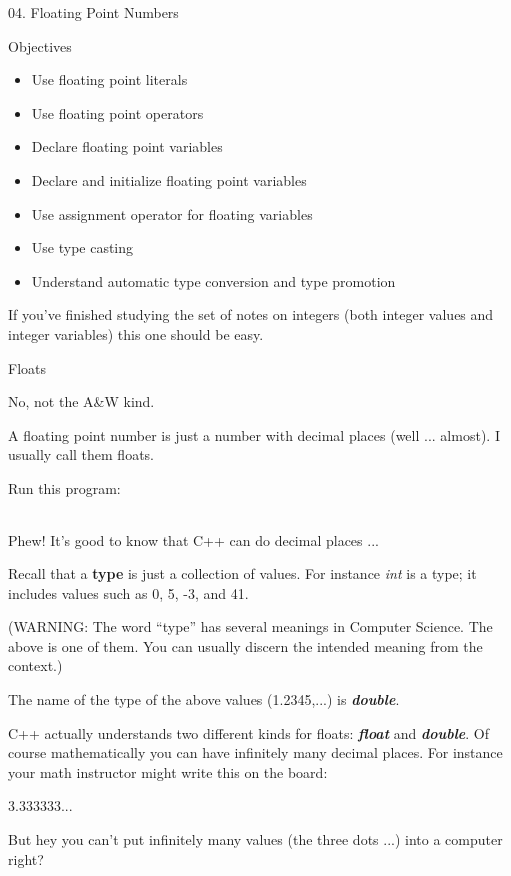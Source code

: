 \documentclass[
]{article}
\author{}
\date{}
\begin{document}
04. Floating Point Numbers

Objectives

\begin{itemize}
\item
  Use floating point literals
\item
  Use floating point operators
\item
  Declare floating point variables
\item
  Declare and initialize floating point variables
\item
  Use assignment operator for floating variables
\item
  Use type casting
\item
  Understand automatic type conversion and type promotion
\end{itemize}

If you've finished studying the set of notes on integers (both integer
values and integer variables) this one should be easy.

Floats

No, not the A\&W kind.

A floating point number is just a number with decimal places (well ...
almost). I usually call them floats.

Run this program:

\begin{longtable}[]{@{}@{}}
\toprule
\endhead
\bottomrule
\end{longtable}

Phew! It's good to know that C++ can do decimal places ...

Recall that a \textbf{type} is just a collection of values. For instance
\emph{int} is a type; it includes values such as 0, 5, -3, and 41.

(WARNING: The word ``type'' has several meanings in Computer Science.
The above is one of them. You can usually discern the intended meaning
from the context.)

The name of the type of the above values (1.2345,...) is
\emph{\textbf{double}}.

C++ actually understands two different kinds for floats:
\emph{\textbf{float}} and \emph{\textbf{double}}. Of course
mathematically you can have infinitely many decimal places. For instance
your math instructor might write this on the board:

3.333333...

But hey you can't put infinitely many values (the three dots ...) into a
computer right?
\end{document}
